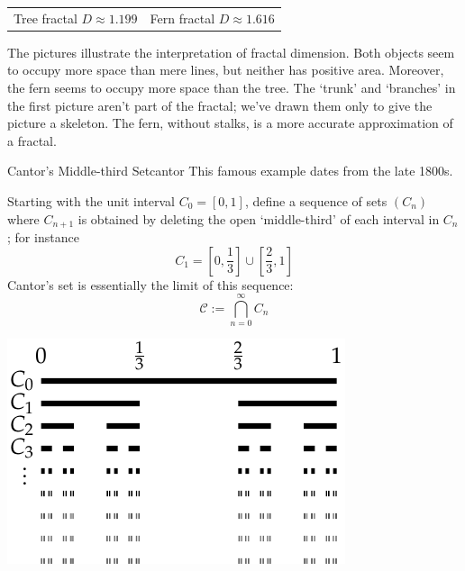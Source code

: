 \begin{example}{}{}
\begin{center}
\begin{tabular}{c@{\qquad\qquad}c}
\\
Tree fractal $D\approx 1.199$
&
Fern fractal $D\approx 1.616$
\end{tabular}
\end{center}%
The pictures illustrate the interpretation of fractal dimension. Both objects seem to occupy more space than mere lines, but neither has positive area. Moreover, the fern seems to occupy more space than the tree. The `trunk' and `branches' in the first picture aren't part of the fractal; we've drawn them only to give the picture a skeleton. The fern, without stalks, is a more accurate approximation of a fractal. 
\end{example}


\goodbreak


\begin{example}{Cantor's Middle-third Set}{cantor}
This famous example dates from the late 1800s.\footnotemark{}\par
\begin{minipage}[t]{0.58\linewidth}\vspace{-5pt}
Starting with the unit interval $C_0=[0,1]$, define a sequence of sets $(C_n)$ where $C_{n+1}$ is obtained by deleting the open `middle-third' of each interval in $C_n$; for instance
\[C_1=\left[0,\frac 13\right]\cup\left[\frac 23,1\right]\]
Cantor's set is essentially the limit of this sequence:
\[\mathcal C:=\bigcap_{n=0}^\infty C_n\]
\end{minipage}\hfill\begin{minipage}[t]{0.4\linewidth}\vspace{-7pt}
\flushright
\href{http://www.math.uci.edu/~ndonalds/math161/cantor-similar.html}{\includegraphics{cantor-set}}
\end{minipage}\medbreak


\end{example}
